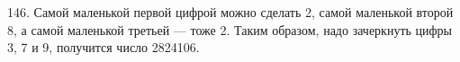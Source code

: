 146. Самой маленькой первой цифрой можно сделать 2, самой маленькой второй 8, а самой маленькой третьей --- тоже 2. Таким образом, надо зачеркнуть цифры 3, 7 и 9, получится число 2824106.\\
